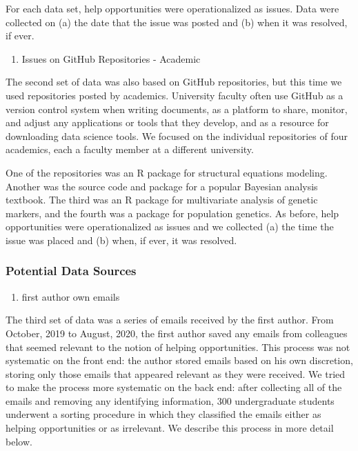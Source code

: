 \documentclass[english,,man]{apa6}
\providecommand{\tightlist}{%
  \setlength{\itemsep}{0pt}\setlength{\parskip}{0pt}}
\theoremstyle{definition}
\theoremstyle{definition}
\theoremstyle{definition}
\theoremstyle{remark}
\begin{document}
For each data set, help opportunities were operationalized as issues.
Data were collected on (a) the date that the issue was posted and (b)
when it was resolved, if ever.

\begin{enumerate}
\def\labelenumi{(\arabic{enumi})}
\setcounter{enumi}{1}
\tightlist
\item
  Issues on GitHub Repositories - Academic
\end{enumerate}

The second set of data was also based on GitHub repositories, but this
time we used repositories posted by academics. University faculty often
use GitHub as a version control system when writing documents, as a
platform to share, monitor, and adjust any applications or tools that
they develop, and as a resource for downloading data science tools. We
focused on the individual repositories of four academics, each a faculty
member at a different university.

One of the repositories was an R package for structural equations
modeling. Another was the source code and package for a popular Bayesian
analysis textbook. The third was an R package for multivariate analysis
of genetic markers, and the fourth was a package for population
genetics. As before, help opportunities were operationalized as issues
and we collected (a) the time the issue was placed and (b) when, if
ever, it was resolved.

\hypertarget{potential-data-sources}{%
\subsubsection{Potential Data Sources}\label{potential-data-sources}}

\begin{enumerate}
\def\labelenumi{(\arabic{enumi})}
\setcounter{enumi}{2}
\tightlist
\item
  first author own emails
\end{enumerate}

The third set of data was a series of emails received by the first
author. From October, 2019 to August, 2020, the first author saved any
emails from colleagues that seemed relevant to the notion of helping
opportunities. This process was not systematic on the front end: the
author stored emails based on his own discretion, storing only those
emails that appeared relevant as they were received. We tried to make
the process more systematic on the back end: after collecting all of the
emails and removing any identifying information, 300 undergraduate
students underwent a sorting procedure in which they classified the
emails either as helping opportunities or as irrelevant. We describe
this process in more detail below.
\end{document}
